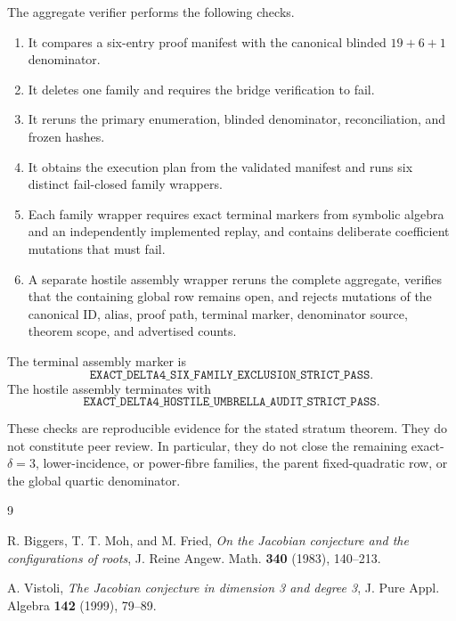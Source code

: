 \documentclass[11pt]{article}
\begin{document}
The aggregate verifier performs the following checks.
\begin{enumerate}[leftmargin=2em]
\item It compares a six-entry proof manifest with the canonical blinded
      \(19+6+1\) denominator.
\item It deletes one family and requires the bridge verification to fail.
\item It reruns the primary enumeration, blinded denominator,
      reconciliation, and frozen hashes.
\item It obtains the execution plan from the validated manifest and runs
      six distinct fail-closed family wrappers.
\item Each family wrapper requires exact terminal markers from symbolic
      algebra and an independently implemented replay, and contains
      deliberate coefficient mutations that must fail.
\item A separate hostile assembly wrapper reruns the complete aggregate,
      verifies that the containing global row remains open, and rejects
      mutations of the canonical ID, alias, proof path, terminal marker,
      denominator source, theorem scope, and advertised counts.
\end{enumerate}
The terminal assembly marker is
\[
\texttt{EXACT\_DELTA4\_SIX\_FAMILY\_EXCLUSION\_STRICT\_PASS}.
\]
The hostile assembly terminates with
\[
\texttt{EXACT\_DELTA4\_HOSTILE\_UMBRELLA\_AUDIT\_STRICT\_PASS}.
\]

These checks are reproducible evidence for the stated stratum theorem.
They do not constitute peer review.  In particular, they do not close the
remaining exact-\(\delta=3\), lower-incidence, or power-fibre families,
the parent fixed-quadratic row, or the global quartic denominator.

\begin{thebibliography}{9}

R. Biggers, T. T. Moh, and M. Fried,
\emph{On the Jacobian conjecture and the configurations of roots},
J. Reine Angew. Math. \textbf{340} (1983), 140--213.

A. Vistoli,
\emph{The Jacobian conjecture in dimension 3 and degree 3},
J. Pure Appl. Algebra \textbf{142} (1999), 79--89.

\end{thebibliography}
\end{document}
